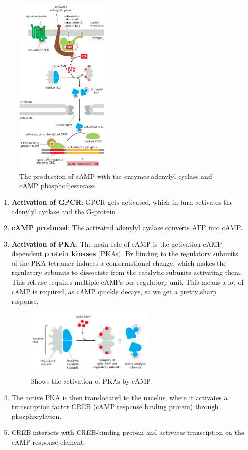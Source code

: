 \documentclass[../main.tex]{subfiles}
\begin{document}
\begin{figure}[H]
	\centering
	\includegraphics[width=0.45\textwidth]{cAMP_path}
	\caption{The production of cAMP with the enzymes adenylyl cyclase and cAMP phosphodiesterase.}
\end{figure}


\begin{enumerate}
	\item \textbf{Activation of GPCR}: GPCR gets activated, which in turn activates the adenylyl cyclase and the G-protein.
	\item \textbf{cAMP produced}: The activated adenylyl cyclase converts ATP into cAMP.
	\item \textbf{ Activation of \gls{PKA}}: The main role of cAMP is the activation cAMP-dependent \textbf{protein kinases} (PKAs). By binding to the regulatory subunits of the PKA tetramer induces a conformational change, which makes the regulatory subunits to dissociate from the catalytic subunits activating them. This release requires multiple cAMPs per regulatory unit. This means a lot of cAMP is required, as cAMP quickly decays, so we get a pretty sharp response.
	\begin{figure}[H]
		\centering
		\includegraphics[width=0.6\textwidth]{cAMP_PKA}
		\caption{Shows the activation of PKAs by cAMP.}
	\end{figure}
	\item The active PKA is then translocated to the nucelus, where it activates a transcription factor \gls{CREB} (cAMP response binding protein) through phosphorylation.
	\item CREB interacts with CREB-binding protein and activates transciption on the cAMP response element.
\end{enumerate}
\end{document}
